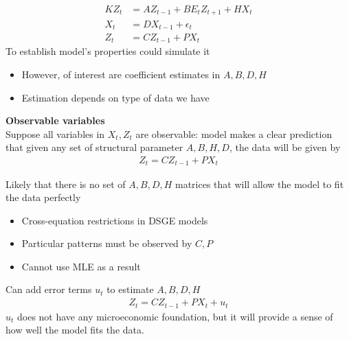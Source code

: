 \documentclass{beamer}
\begin{document}
\begin{frame}
 \begin{align*}  
 KZ_t &= AZ_{t-1} + BE_tZ_{t+1} + HX_t\\
 X_t&=DX_{t-1}+\epsilon_t\\  
 Z_t&=CZ_{t-1}+PX_t 
\end{align*}
 To establish model's properties could simulate it
 \begin{itemize}
   \item However, of interest are coefficient estimates in $A, B, D, H$
   \item Estimation depends on type of data we have
 \end{itemize} 
\end{frame}


\begin{frame}
  \textbf{Observable variables}\\
  Suppose all variables in $X_t,Z_t$ are observable: model makes a clear prediction that given any set of structural parameter $A,B,H,D$, the data will be given by
\begin{align}  
  Z_t=CZ_{t-1}+PX_t 
\end{align}
\end{frame}

\begin{frame}
  Likely that there is no set of $A,B,D,H$ matrices that will allow the model to fit the data perfectly
  \begin{itemize}
    \item Cross-equation restrictions in DSGE models
    \item Particular patterns must be observed by $C,P$
    \item Cannot use MLE as a result
  \end{itemize}
  Can add error terms $u_t$ to estimate $A, B, D, H$ 
\begin{align}
  Z_t=CZ_{t-1} + PX_t + u_t
\end{align}
$u_t$ does not have any microeconomic foundation, but it will provide a sense of how well the model fits the data.
\end{frame}
\end{document}
